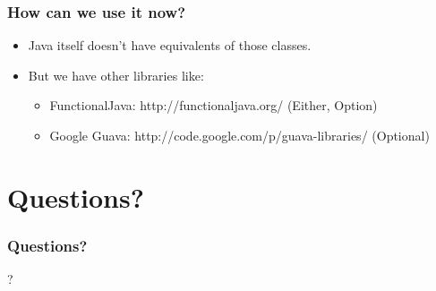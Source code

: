 \documentclass[xcolor=dvipsnames]{beamer}
\begin{document}
\begin{frame}
\frametitle{How can we use it now?}
\begin{itemize}
\item Java itself doesn't have equivalents of those classes.
\item But we have other libraries like:
	\begin{itemize}
	\item FunctionalJava: http://functionaljava.org/ (Either, Option)
	\item Google Guava: http://code.google.com/p/guava-libraries/ (Optional)
	\end{itemize}
\end{itemize}
\end{frame}

\section{Questions?}

\begin{frame}
\frametitle{Questions?}
\begin{center}
\Huge{?}
\end{center}
\end{frame}
\end{document}
